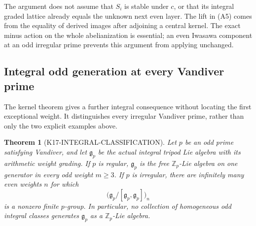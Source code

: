 \documentclass[11pt,a4paper]{article}
\newtheorem{theorem}{Theorem}[section]
\theoremstyle{definition}
\begin{document}
The argument does not assume that $S_i$ is stable under
$c$, or that its integral graded lattice already equals
the unknown next even layer. The lift in (A5) comes from
the equality of derived images after adjoining a central
kernel. The exact minus action on the whole abelianization
is essential; an even Iwasawa component at an odd irregular
prime prevents this argument from applying unchanged.

\subsection{Integral odd generation at every Vandiver prime}
\label{sec:integral-classification}

The kernel theorem gives a further integral consequence without locating
the first exceptional weight.  It distinguishes every irregular Vandiver
prime, rather than only the two explicit examples above.

\begin{theorem}[K17-INTEGRAL-CLASSIFICATION]
\label{thm:integral-classification}
Let $p$ be an odd prime satisfying Vandiver, and let
$\mathfrak g_p$ be the actual integral tripod Lie algebra with its
arithmetic weight grading.
If $p$ is regular, $\mathfrak g_p$ is the free $\mathbb Z_p$-Lie
algebra on one generator in every odd weight $m\ge3$.
If $p$ is irregular, there are infinitely many even weights $n$ for which
\[
 \bigl(\mathfrak g_p/[\mathfrak g_p,\mathfrak g_p]\bigr)_n
\]
is a nonzero finite $p$-group.  In particular, no collection of
homogeneous odd integral classes generates $\mathfrak g_p$ as a
$\mathbb Z_p$-Lie algebra.
\end{theorem}
\end{document}
